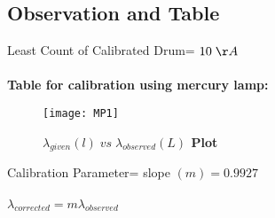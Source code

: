 \documentclass[9pt,a4paper]{article}
\begin{document}
\begin{multicols*}{2}
\vspace*{0.2cm}
\section{Observation and Table}
Least Count of Calibrated Drum= $10\;\AA$\\\\
\textbf{Table for calibration using mercury lamp:}
\begin{table}[H]
\centering
{}\caption{\label{tab1}\textbf{For calibration using mercury lamp}} 
\end{table}

\begin{figure}[H]
\texttt{[image: MP1]}
\caption{\textbf{$\lambda_{given}(l)\;vs\;\lambda_{observed} (L)$ Plot}}
\label{fig4}
\end{figure}

Calibration Parameter= slope $(m)=0.9927$\\\\
{}$\lambda_{corrected}=m\lambda_{observed}$\\\\


\end{multicols*}
\end{document}
